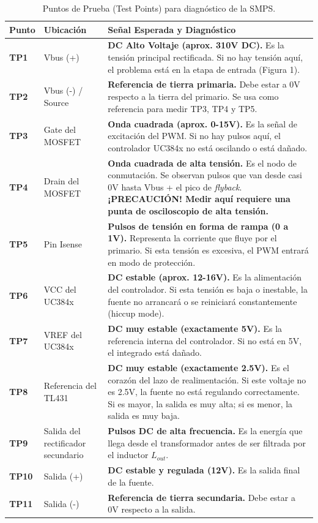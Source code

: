\documentclass[12pt, a4paper]{article}
\begin{document}
\begin{table}[H]
    \centering
    \caption{Puntos de Prueba (Test Points) para diagnóstico de la SMPS.}
    \renewcommand{\arraystretch}{1.3}
    \begin{tabular}{|p{1.5cm}|p{3.5cm}|p{9.5cm}|}
        \hline
        \textbf{Punto} & \textbf{Ubicación} & \textbf{Señal Esperada y Diagnóstico} \\ \hline
        \textbf{TP1} & Vbus (+) & \textbf{DC Alto Voltaje (aprox. 310V DC).} Es la tensión principal rectificada. Si no hay tensión aquí, el problema está en la etapa de entrada (Figura 1). \\ \hline
        \textbf{TP2} & Vbus (-) / Source & \textbf{Referencia de tierra primaria.} Debe estar a 0V respecto a la tierra del primario. Se usa como referencia para medir TP3, TP4 y TP5. \\ \hline
        \textbf{TP3} & Gate del MOSFET & \textbf{Onda cuadrada (aprox. 0-15V).} Es la señal de excitación del PWM. Si no hay pulsos aquí, el controlador UC384x no está oscilando o está dañado. \\ \hline
        \textbf{TP4} & Drain del MOSFET & \textbf{Onda cuadrada de alta tensión.} Es el nodo de conmutación. Se observan pulsos que van desde casi 0V hasta Vbus + el pico de \textit{flyback}. \textbf{¡PRECAUCIÓN! Medir aquí requiere una punta de osciloscopio de alta tensión.} \\ \hline
        \textbf{TP5} & Pin Isense & \textbf{Pulsos de tensión en forma de rampa (0 a 1V).} Representa la corriente que fluye por el primario. Si esta tensión es excesiva, el PWM entrará en modo de protección. \\ \hline
        \textbf{TP6} & VCC del UC384x & \textbf{DC estable (aprox. 12-16V).} Es la alimentación del controlador. Si esta tensión es baja o inestable, la fuente no arrancará o se reiniciará constantemente (hiccup mode). \\ \hline
        \textbf{TP7} & VREF del UC384x & \textbf{DC muy estable (exactamente 5V).} Es la referencia interna del controlador. Si no está en 5V, el integrado está dañado. \\ \hline
        \textbf{TP8} & Referencia del TL431 & \textbf{DC muy estable (exactamente 2.5V).} Es el corazón del lazo de realimentación. Si este voltaje no es 2.5V, la fuente no está regulando correctamente. Si es mayor, la salida es muy alta; si es menor, la salida es muy baja. \\ \hline
        \textbf{TP9} & Salida del rectificador secundario & \textbf{Pulsos DC de alta frecuencia.} Es la energía que llega desde el transformador antes de ser filtrada por el inductor $L_{out}$. \\ \hline
        \textbf{TP10} & Salida (+) & \textbf{DC estable y regulada (12V).} Es la salida final de la fuente. \\ \hline
        \textbf{TP11} & Salida (-) & \textbf{Referencia de tierra secundaria.} Debe estar a 0V respecto a la salida. \\ \hline
    \end{tabular}
\end{table}
\end{document}
